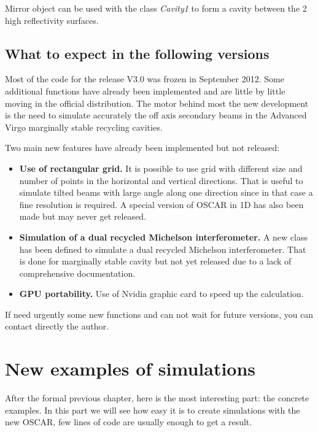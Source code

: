 Mirror object can be used with the class \textsl{Cavity1} to form a cavity between the 2 high reflectivity surfaces.


\section{What to expect in the following versions}

Most of the code for the release V3.0 was frozen in September 2012. Some additional functions have already been implemented and are little by little moving in the official distribution. The motor behind most the new development is the need to simulate accurately the off axis secondary beams in the Advanced Virgo marginally stable recycling cavities.

Two main new features have already been implemented but not released:

\begin{itemize}
  \item \textbf{Use of rectangular grid.} It is possible to use grid with different size and number of points in the horizontal and vertical directions. That is useful to simulate tilted beams with large angle along one direction since in that case a fine resolution is required. A special version of OSCAR in 1D has also been made but may never get released.
  \item \textbf{Simulation of a dual recycled Michelson interferometer.} A new class has been defined to simulate a dual recycled Michelson interferometer. That is done for marginally stable cavity but not yet released due to a lack of comprehensive documentation.
   \item \textbf{GPU portability.} Use of Nvidia graphic card to speed up the calculation.
\end{itemize}

If need urgently some new functions and can not wait for future versions, you can contact directly the author.


\chapter{New examples of simulations}\label{ch4:ex}

After the formal previous chapter, here is the most interesting part: the concrete examples. In this part we will see how easy it is to create simulations with the new OSCAR, few lines of code are usually enough to get a result.

